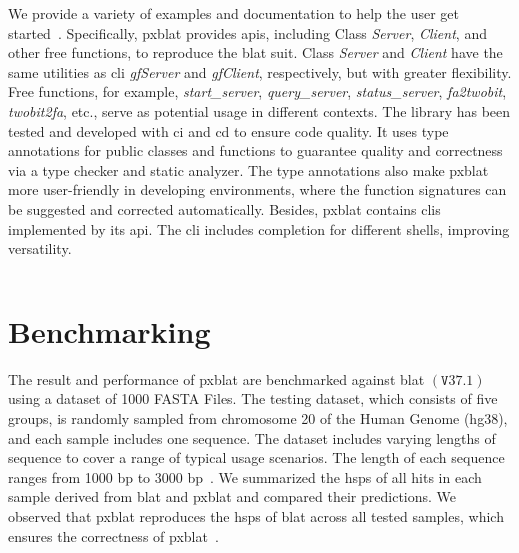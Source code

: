 We provide a variety of examples and documentation to help the user get started~.
Specifically, \gls{pxblat} provides \glspl{api}, including Class \emph{Server}, \emph{Client}, and other free functions, to reproduce the \gls{blat} suit.
Class \emph{Server} and \emph{Client} have the same utilities as \gls{cli} \emph{gfServer} and \emph{gfClient}, respectively, but with greater flexibility.
Free functions, for example, \emph{start\_server}, \emph{query\_server}, \emph{status\_server}, \emph{fa2twobit}, \emph{twobit2fa}, etc., serve as potential usage in different contexts.
The library has been tested and developed with \gls{ci} and \gls{cd} to ensure code quality.
It uses type annotations for public classes and functions to guarantee quality and correctness via a type checker and static analyzer.
The type annotations also make \gls{pxblat} more user-friendly in developing environments, where the function signatures can be suggested and corrected automatically.
Besides, \gls{pxblat} contains \glspl{cli} implemented by its \gls{api}.
The \gls{cli} includes completion for different shells, improving versatility.

\begin{listing}
	\inputminted[breaklines]{python}{codes/example1.py}
	\label{listing:example}
\end{listing}


\section*{Benchmarking}\label{sec:benchmarking}

The result and performance of \gls{pxblat} are benchmarked against \gls{blat} \(\left(\mathtt{V}37.1\right)\) using a dataset of \num[round-mode=places, round-precision=0]{1000} FASTA Files.
The testing dataset, which consists of five groups, is randomly sampled from chromosome \num[round-mode=places, round-precision=0]{20} of the Human Genome (hg38), and each sample includes one sequence.
The dataset includes varying lengths of sequence to cover a range of typical usage scenarios.
The length of each sequence ranges from \num[round-mode=places, round-precision=0]{1000} bp to \num[round-mode=places, round-precision=0]{3000} bp~.
We summarized the \glspl{hsp} of all hits in each sample derived from \gls{blat} and \gls{pxblat} and compared their predictions. We observed that \gls{pxblat} reproduces the \glspl{hsp} of \gls{blat} across all tested samples, which ensures the correctness of \gls{pxblat}~.

